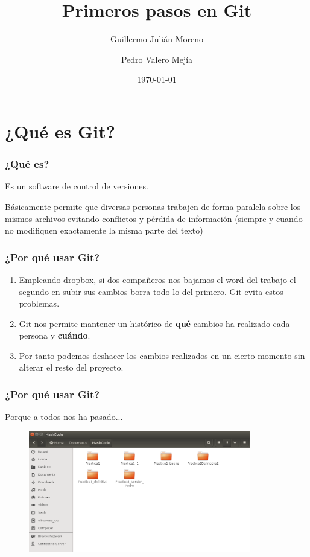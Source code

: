 \documentclass[10pt,compress,usetitleprogressbar,aspectratio=1610,mathserif,notes]{beamer}
\title{Primeros pasos en Git}
\author{Guillermo Julián Moreno \and Pedro Valero Mejía}
\date{\today}
\begin{document}
\maketitle

\section{¿Qué es Git?}

\begin{frame}
\frametitle{¿Qué es?}

Es un software de control de versiones.

Básicamente permite que diversas personas trabajen de forma paralela sobre los mismos archivos evitando conflictos y pérdida de información (siempre y cuando no modifiquen exactamente la misma parte del texto)
\end{frame}


\begin{frame}
\frametitle{¿Por qué usar Git?}
\begin{enumerate}
\item Empleando dropbox, si dos compañeros nos bajamos el word del trabajo el segundo en subir sus cambios borra todo lo del primero. Git evita estos problemas.
\item Git nos permite mantener un histórico de \textbf{qué} cambios ha realizado cada persona y \textbf{cuándo}.
\item Por tanto podemos deshacer los cambios realizados en un cierto momento sin alterar el resto del proyecto.
\end{enumerate}
\end{frame}

\begin{frame}
\frametitle{¿Por qué usar Git?}

Porque a todos nos ha pasado...
\begin{figure}[b]
\centering
\includegraphics[height = 150pt]{dropboxClassic.png}
\end{figure}
\end{frame}
\end{document}
